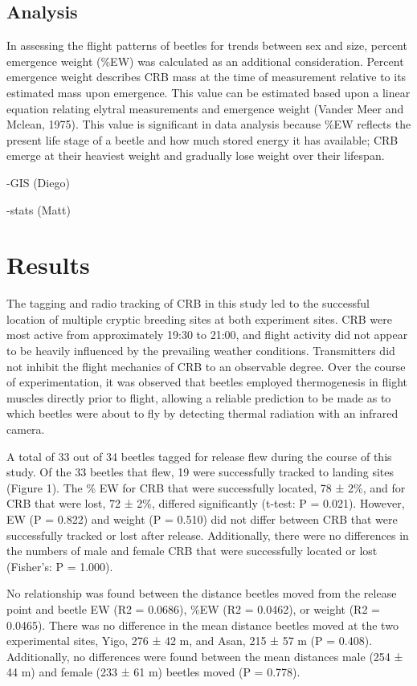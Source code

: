 \documentclass[11pt,letterpaper]{scrartcl}
\begin{document}
\subsection*{Analysis}

In assessing the flight patterns of beetles for trends between sex and size, percent emergence weight (\%EW) was calculated as an additional consideration. Percent emergence weight describes CRB mass at the time of measurement relative to its estimated mass upon emergence. This value can be estimated based upon a linear equation relating elytral measurements and emergence weight (Vander Meer and Mclean, 1975). This value is significant in data analysis because \%EW reflects the present life stage of a beetle and how much stored energy it has available; CRB emerge at their heaviest weight and gradually lose weight over their lifespan.  

-GIS (Diego)

-stats (Matt)

\section*{Results}

The tagging and radio tracking of CRB in this study led to the successful location of multiple cryptic breeding sites at both experiment sites. CRB were most active from approximately 19:30 to 21:00, and flight activity did not appear to be heavily influenced by the prevailing weather conditions. Transmitters did not inhibit the flight mechanics of CRB to an observable degree. Over the course of experimentation, it was observed that beetles employed thermogenesis in flight muscles directly prior to flight, allowing a reliable prediction to be made as to which beetles were about to fly by detecting thermal radiation with an infrared camera. 

	A total of 33 out of 34 beetles tagged for release flew during the course of this study. Of the 33 beetles that flew, 19 were successfully tracked to landing sites (Figure 1). The \% EW for CRB that were successfully located, 78 ± 2\%, and for CRB that were lost, 72 ± 2\%, differed significantly (t-test: P = 0.021).  However, EW (P = 0.822) and weight (P = 0.510) did not differ between CRB that were successfully tracked or lost after release.  Additionally, there were no differences in the numbers of male and female CRB that were successfully located or lost (Fisher’s: P = 1.000). 
    
No relationship was found between the distance beetles moved from the release point and beetle EW (R2 = 0.0686), \%EW (R2 = 0.0462), or weight (R2 = 0.0465).  There was no difference in the mean distance beetles moved at the two experimental sites, Yigo, 276 ± 42 m, and Asan, 215 ± 57 m (P = 0.408).  Additionally, no differences were found between the mean distances male (254 ± 44 m) and female (233 ± 61 m) beetles moved (P = 0.778).  
\end{document}
